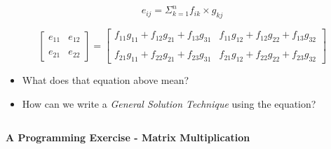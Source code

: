 \documentclass[fleqn]{beamer} %
\newcommand{\sectionIIsubsectionIIItitle}{}
\newcommand{\sectionIIsubsectionIVtitle}{}
\begin{document}
			\begin{frame}
				\frametitle{\sectionIIsubsectionIIItitle} \small
				\bigskip


				\begin{fleqn}		 
				\[ e_{ij}=\Sigma_{k=1}^n f_{ik}\times g_{kj} \]
	 
					\[
					\left[ \begin{array}{cc}
					e_{11} & e_{12}  \\
					& \\ 
					e_{21} & e_{22}  \end{array}	\right]=\left[ \begin{array}{c|c}
					f_{11}g_{11}+f_{12}g_{21}+f_{13}g_{31} & f_{11}g_{12}+f_{12}g_{22}+f_{13}g_{32}  \\
					& \\ 
					f_{21}g_{11}+f_{22}g_{21}+f_{23}g_{31} & f_{21}g_{12}+f_{22}g_{22}+f_{23}g_{32}  \end{array}	\right]
					\]
		 
				\end{fleqn}	

				\begin{itemize}
		
					\item What does that equation above mean? \\
					\item How can we write a {\it General Solution Technique} using the equation?
			
				\end{itemize}

				
				\btVFill 
			\end{frame}

			\begin{frame}
				\frametitle{\sectionIIsubsectionIIItitle}\small
				\bigskip



				\btVFill 
			\end{frame}


		\subsection{\sectionIIsubsectionIVtitle}\label{sectionIIsubsectionIV}

			\begin{frame}
				\frametitle{\sectionIIsubsectionIVtitle}
				\bigskip

				\textbf{A Programming Exercise - Matrix Multiplication}\\	


				\btVFill 
			\end{frame}
\end{document}
